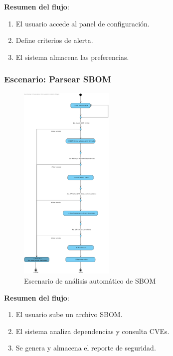 \documentclass[11pt]{article}
\begin{document}
\textbf{Resumen del flujo}:
\begin{enumerate}
    \item El usuario accede al panel de configuración.
    \item Define criterios de alerta.
    \item El sistema almacena las preferencias.
\end{enumerate}

\subsubsection*{Escenario: Parsear SBOM}

\begin{figure}[H]
    \centering
    \vspace{0.5cm}  %
    \includegraphics[width=0.4\textwidth]{images/Parse_SBOM-Scenario.png}
    \caption{Escenario de análisis automático de SBOM}
    \vspace{0.5cm}  %
\end{figure}


\textbf{Resumen del flujo}:
\begin{enumerate}
    \item El usuario sube un archivo SBOM.
    \item El sistema analiza dependencias y consulta CVEs.
    \item Se genera y almacena el reporte de seguridad.
\end{enumerate}
\end{document}
